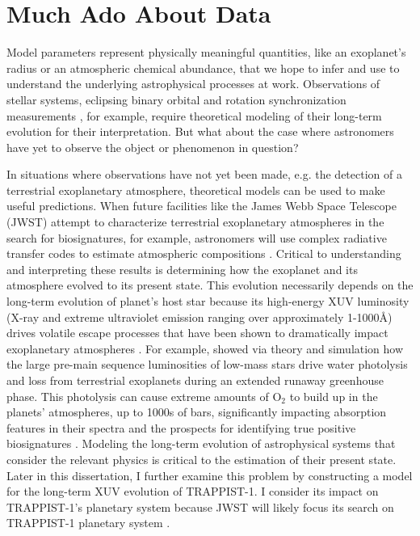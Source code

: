 \section{Much Ado About Data}

Model parameters represent physically meaningful quantities, like an exoplanet's radius or an atmospheric chemical abundance, that we hope to infer and use to understand the underlying astrophysical processes at work. Observations of stellar systems, \kepler eclipsing binary orbital and rotation synchronization measurements \citep[e.g.][]{McQuillan2014,Lurie2017}, for example, require theoretical modeling of their long-term evolution for their interpretation. But what about the case where astronomers have yet to observe the object or phenomenon in question?

In situations where observations have not yet been made, e.g. the detection of a terrestrial exoplanetary atmosphere, theoretical models can be used to make useful predictions.  When future facilities like the James Webb Space Telescope (JWST) attempt to characterize terrestrial exoplanetary atmospheres in the search for biosignatures, for example, astronomers will use complex radiative transfer codes to estimate atmospheric compositions \citep[e.g. SMART;][]{Meadows1996,Crisp1997}. Critical to understanding and interpreting these results is determining how the exoplanet and its atmosphere evolved to its present state. This evolution necessarily depends on the long-term evolution of planet's host star because its high-energy XUV luminosity (X-ray and extreme ultraviolet emission ranging over approximately 1-1000\AA) drives volatile escape processes that have been shown to dramatically impact exoplanetary atmospheres \citep{Watson1981,Lammer2003,MurrayClay2009}. For example, \citet{Luger2015} showed via theory and simulation how the large pre-main sequence luminosities of low-mass stars drive water photolysis and loss from terrestrial exoplanets during an extended runaway greenhouse phase. This photolysis can cause extreme amounts of O$_2$ to build up in the planets' atmospheres, up to 1000s of bars, significantly impacting absorption features in their spectra and the prospects for identifying true positive biosignatures \citep[see][]{Meadows2017,Meadows2018}. Modeling the long-term evolution of astrophysical systems that consider the relevant physics is critical to the estimation of their present state. Later in this dissertation, I further examine this problem by constructing a model for the long-term XUV evolution of TRAPPIST-1. I consider its impact on TRAPPIST-1's planetary system because JWST will likely focus its search on TRAPPIST-1 planetary system \citep{Morley2017,Lincowski2018,Lustig2019}. 


